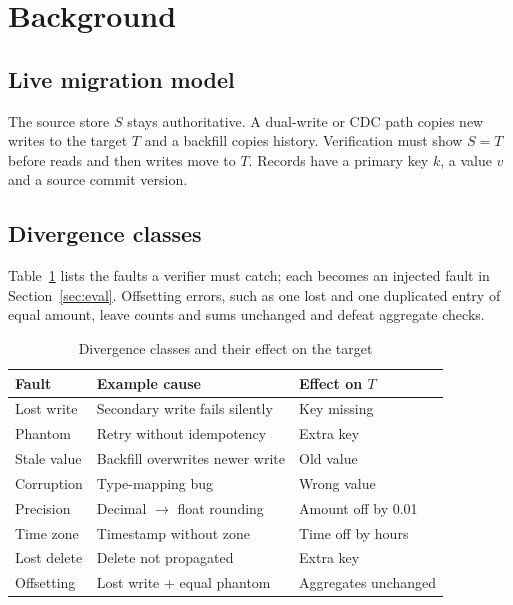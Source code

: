 \documentclass[conference]{IEEEtran}
\begin{document}
\section{Background}
\subsection{Live migration model}
The source store $S$ stays authoritative. A dual-write or CDC path copies new writes to the target $T$ and a backfill copies history. Verification must show $S=T$ before reads and then writes move to $T$. Records have a primary key $k$, a value $v$ and a source commit version.

\subsection{Divergence classes}
Table~\ref{tab:faults} lists the faults a verifier must catch; each becomes an injected fault in Section~\ref{sec:eval}. Offsetting errors, such as one lost and one duplicated entry of equal amount, leave counts and sums unchanged and defeat aggregate checks.

\begin{table}[t]
\caption{Divergence classes and their effect on the target}
\label{tab:faults}
\centering\footnotesize
\begin{tabular}{@{}lll@{}}
\toprule
Fault & Example cause & Effect on $T$\\
\midrule
Lost write & Secondary write fails silently & Key missing\\
Phantom & Retry without idempotency & Extra key\\
Stale value & Backfill overwrites newer write & Old value\\
Corruption & Type-mapping bug & Wrong value\\
Precision & Decimal $\to$ float rounding & Amount off by 0.01\\
Time zone & Timestamp without zone & Time off by hours\\
Lost delete & Delete not propagated & Extra key\\
Offsetting & Lost write + equal phantom & Aggregates unchanged\\
\bottomrule
\end{tabular}
\end{table}
\end{document}
